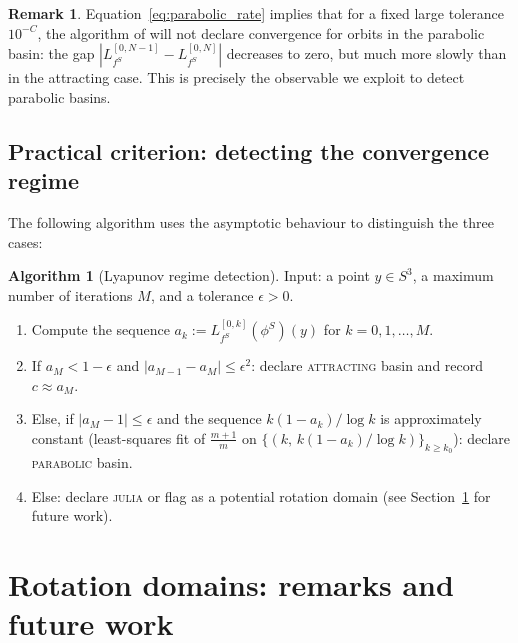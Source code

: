 \documentclass[12pt]{article}
\theoremstyle{definition}
\newtheorem{remark}[theorem]{Remark}
\newtheorem{algorithm_desc}[theorem]{Algorithm}
\begin{document}
\begin{remark}
  Equation~\eqref{eq:parabolic_rate} implies that for a fixed large
  tolerance $10^{-C}$, the algorithm of \cite{Alvarez2023} will not
  declare convergence for orbits in the parabolic basin: the gap
  $|L_{f^S}^{[0,N-1]} - L_{f^S}^{[0,N]}|$ decreases to zero, but
  much more slowly than in the attracting case.  This is precisely the
  observable we exploit to detect parabolic basins.
\end{remark}

\subsection{Practical criterion: detecting the convergence regime}

The following algorithm uses the asymptotic behaviour to distinguish the
three cases:

\begin{algorithm_desc}[Lyapunov regime detection]\label{alg:lyapunov}
  Input: a point $y \in S^3$, a maximum number of iterations $M$,
  and a tolerance $\epsilon > 0$.
  \begin{enumerate}[label=Step \arabic*.]
    \item Compute the sequence $a_k := L_{f^S}^{[0,k]}(\phi^S)(y)$ for
          $k = 0, 1, \ldots, M$.
    \item If $a_M < 1 - \epsilon$ and
          $|a_{M-1} - a_M| \le \epsilon^2$:
          declare \textsc{attracting} basin and record $c \approx a_M$.
    \item Else, if $|a_M - 1| \le \epsilon$ and the sequence
          $k(1-a_k)/\log k$ is approximately constant
          (least-squares fit of $\tfrac{m+1}{m}$ on
          $\{(k,\, k(1-a_k)/\log k)\}_{k\ge k_0}$):
          declare \textsc{parabolic} basin.
    \item Else: declare \textsc{julia} or flag as a potential rotation
          domain (see Section~\ref{sec:rotation} for future work).
  \end{enumerate}
\end{algorithm_desc}

\section{Rotation domains: remarks and future work}
\label{sec:rotation}
\end{document}
